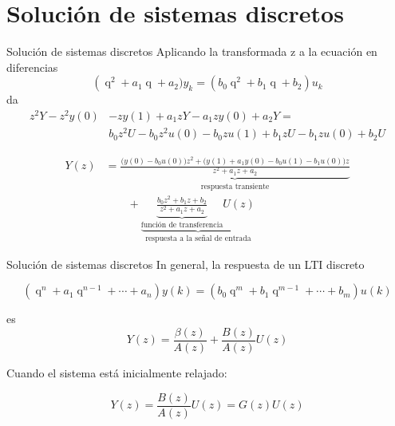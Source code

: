 \documentclass[presentation,aspectratio=169]{beamer}
\DeclareMathOperator{\shift}{q}
\begin{document}
\section{Solución de sistemas discretos}
\label{sec:org81d1523}
\begin{frame}[label={sec:orga87c14c}]{Solución de sistemas discretos}
Aplicando la transformada z a la ecuación en diferencias
\[ \left( \shift^2 + a_1\shift + a_2) y_k = \left(b_0\shift^2 + b_1\shift + b_2 \right) u_k\]
da
\begin{equation*}
\begin{split}
z^{2}Y -z^2y(0) &- zy(1) + a_1zY - a_1zy(0) + a_2Y =\\
&     b_0z^2U -b_0z^2u(0) - b_0zu(1) + b_1zU - b_1zu(0) + b_2U
\end{split}
\end{equation*}

\begin{equation*}
\begin{split}
 Y(z) &= \underbrace{ \frac{ \big( y(0)-b_0u(0)\big) z^2 + \big(y(1)+a_1y(0) - b_0u(1) -b_1u(0)\big) z}{z^2 + a_1z + a_2}}_{\text{respuesta transiente}}\\
 & \qquad + \underbrace{\underbrace{\frac{b_0z^2 + b_1z + b_2}{z^2 + a_1z + a_2}}_{\text{función de transferencia}}U(z)}_{\text{respuesta a la señal de entrada}}
\end{split}
\end{equation*}
\end{frame}

\begin{frame}[label={sec:org6792b28}]{Solución de sistemas discretos}
In general, la respuesta de un LTI discreto 

\[ \left( \shift^n + a_1 \shift^{n-1} + \cdots + a_n \right) y(k) = \left( b_0 \shift^m + b_1\shift^{m-1} + \cdots + b_m \right)  u(k) \]

es
\[ Y(z) = \frac{\beta(z)}{A(z)} + \frac{B(z)}{A(z)} U(z) \]

Cuando el sistema está inicialmente relajado: 

\[ Y(z) = \frac{B(z)}{A(z)} U(z)  = G(z) U(z) \]
\end{frame}
\end{document}

